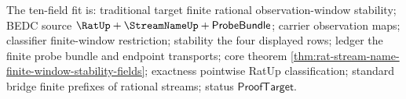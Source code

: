 The ten-field fit is: traditional target finite rational observation-window
stability; BEDC source $\RatUp+\StreamNameUp+\mathsf{ProbeBundle}$; carrier
observation maps; classifier finite-window restriction; stability the four
displayed rows; ledger the finite probe bundle and endpoint transports; core
theorem \autoref{thm:rat-stream-name-finite-window-stability-fields};
exactness pointwise RatUp classification; standard bridge finite prefixes of
rational streams; status $\mathsf{ProofTarget}$.
